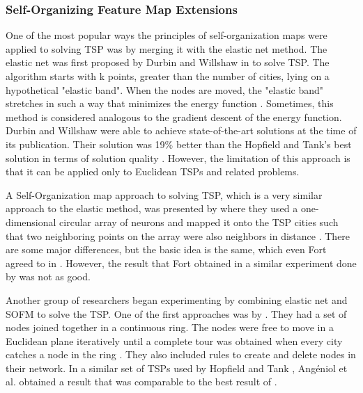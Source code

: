 \documentclass{article}
\begin{document}
\subsubsection{Self-Organizing Feature Map Extensions}
One of the most popular ways the principles of self-organization maps were applied to solving TSP was by merging it with the elastic net method. The elastic net was first proposed by Durbin and Willshaw in \cite{durbin1987analogue} to solve TSP. The algorithm starts with k points, greater than the number of cities, lying on a hypothetical "elastic band". When the nodes are moved, the "elastic band" stretches in such a way that minimizes the energy function \cite{smith1999neural, durbin1987analogue}. Sometimes, this method is considered analogous to the gradient descent of the energy function. Durbin and Willshaw were able to achieve state-of-the-art solutions \cite{lin1973effective} at the time of its publication. Their solution was 19\% better than the Hopfield and Tank's best solution in terms of solution quality \cite{smith1999neural}. However, the limitation of this approach is that it can be applied only to Euclidean TSPs and related problems.

A Self-Organization map approach to solving TSP, which is a very similar approach to the elastic method, was presented by \cite{fort1988solving} where they used a one-dimensional circular array of neurons and mapped it onto the TSP cities such that two neighboring points on the array were also neighbors in distance \cite{smith1999neural}. There are some major differences, but the basic idea is the same, which even Fort agreed to in \cite{fort1988solving}. However, the result that Fort obtained in a similar experiment done by \cite{durbin1987analogue} was not as good.

Another group of researchers began experimenting by combining elastic net and SOFM to solve the TSP. One of the first approaches was by \cite{angeniol1988self}. They had a set of nodes joined together in a continuous ring. The nodes were free to move in a Euclidean plane iteratively until a complete tour was obtained when every city catches a node in the ring \cite{smith1999neural}. They also included rules to create and delete nodes in their network. In a similar set of TSPs used by Hopfield and Tank \cite{hopfield1985neural}, Ang\'eniol et al. obtained a result that was comparable to the best result of \cite{durbin1987analogue}.
\end{document}
